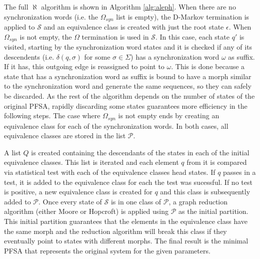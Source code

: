 {The full $\aleph$ algorithm is shown in Algorithm \ref{alg:aleph}. When there are no synchronization words (i.e. the $\Omega_{syn}$ list is empty), the D-Markov termination is applied to $\mathcal{S}$ and an equivalence class is created with just the root state $\epsilon$. When $\Omega_{syn}$ is not empty, the $\Omega$ termination is used in $\mathcal{S}$. In this case, each state $q'$ is visited, starting by the synchronization word states and it is checked if any of its descendents (i.e. $\delta(q,\sigma)$ for some $\sigma \in \Sigma$) has a synchronization word $\omega$ as suffix. If it has, this outgoing edge is reassigned to point to $\omega$. This is done because a state that has a synchronization word as suffix is bound to have a morph similar to the synchronization word and generate the same sequences, so they can safely be discarded. As the rest of the algorithm depends on the number of states of the original PFSA, rapidly discarding some states guarantees more efficiency in the following steps. The case where $\Omega_{syn}$ is not empty ends by creating an equivalence class for each of the synchronization words. In both cases, all equivalence classes are stored in the list $\mathcal{P}$. 

A list $Q$ is created containing the descendants of the states in each of the initial equivalence classes. This list is iterated and each element $q$ from it is compared via statistical test with each of the equivalence classes head states. If $q$ passes in a test, it is added to the equivalence class for each the test was sucessful. If no test is positive, a new equivalence class is created for $q$ and this class is subsequently added to $\mathcal{P}$. Once every state of $\mathcal{S}$ is in one class of $\mathcal{P}$, a graph reduction algorithm (either Moore or Hopcroft) is applied using $\mathcal{P}$ as the initial partition. This initial partition guarantees that the elements in the equivalence class have the same morph and the reduction algorithm will break this class if they eventually point to states with different morphs.  The final result is the minimal PFSA that represents the original system for the given parameters.  

}
